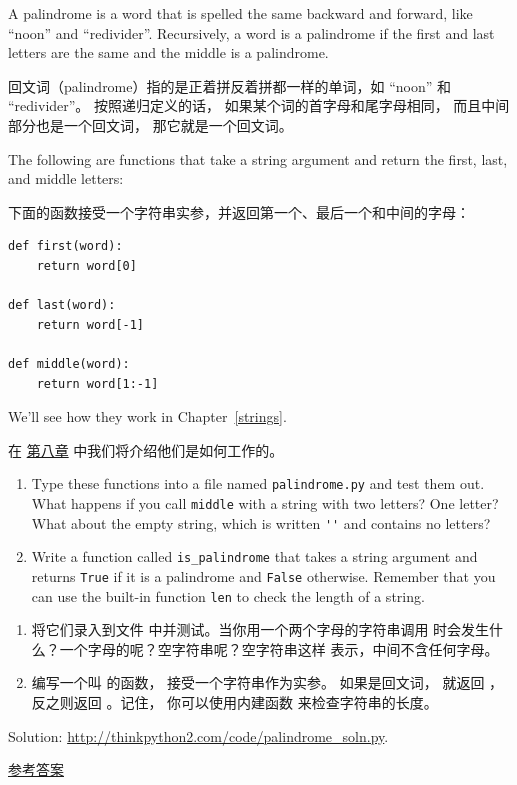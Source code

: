 \begin{exercise}
\label{palindrome}

A palindrome is a word that is spelled the same backward and
forward, like ``noon'' and ``redivider''.  Recursively, a word
is a palindrome if the first and last letters are the same
and the middle is a palindrome.

回文词（palindrome）指的是正着拼反着拼都一样的单词，如 ``noon'' 和 ``redivider''。
按照递归定义的话， 如果某个词的首字母和尾字母相同， 而且中间部分也是一个回文词， 那它就是一个回文词。

The following are functions that take a string argument and
return the first, last, and middle letters:

下面的函数接受一个字符串实参，并返回第一个、最后一个和中间的字母：

\begin{lstlisting}
def first(word):
    return word[0]

def last(word):
    return word[-1]

def middle(word):
    return word[1:-1]
\end{lstlisting}

%
We'll see how they work in Chapter~\ref{strings}.

在 \hyperref[strings]{第八章} 中我们将介绍他们是如何工作的。

\begin{enumerate}

\item Type these functions into a file named {\tt palindrome.py}
and test them out.  What happens if you call {\tt middle} with
a string with two letters?  One letter?  What about the empty
string, which is written \verb"''" and contains no letters?

\item Write a function called \verb"is_palindrome" that takes
a string argument and returns {\tt True} if it is a palindrome
and {\tt False} otherwise.  Remember that you can use the
built-in function {\tt len} to check the length of a string.

\end{enumerate}

\begin{enumerate}

\item 将它们录入到文件  中并测试。当你用一个两个字母的字符串调用  时会发生什么？一个字母的呢？空字符串呢？空字符串这样  表示，中间不含任何字母。

\item 编写一个叫  的函数， 接受一个字符串作为实参。 如果是回文词， 就返回  ，反之则返回  。记住， 你可以使用内建函数  来检查字符串的长度。

\end{enumerate}

Solution: \url{http://thinkpython2.com/code/palindrome_soln.py}.

\href{http://thinkpython2.com/code/palindrome_soln.py}{参考答案}

\end{exercise}

